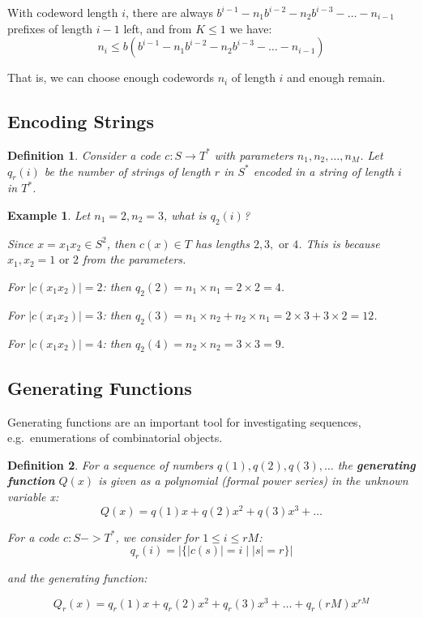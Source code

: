 \documentclass[11pt]{article}
\newtheorem{defn}{Definition}
\newtheorem{eg}{Example}
\begin{document}
With codeword length $i$, there are always $b^{i - 1} - n_1b^{i - 2} - n_2b^{i-3} - \ldots - n_{i - 1}$ prefixes of length $i - 1$ left, and from $K \leq 1$ we have:
\[ n_i \leq b(b^{i - 1} - n_1b^{i - 2} - n_2b^{i - 3} - \ldots - n_{i - 1}) \]

That is, we can choose enough codewords $n_i$ of length $i$ and enough remain.

\subsection{Encoding Strings}
\begin{defn}
  Consider a code $c : S \rightarrow T^*$ with parameters $n_1, n_2, \ldots, n_M$.
  Let $q_r(i)$ be the number of strings of length $r$ in $S^*$ encoded in a string of length $i$ in $T^*$.
\end{defn}

\begin{eg}
  Let $n_1 = 2, n_2 = 3$, what is $q_2(i)$?

  Since $x = x_1x_2 \in S^2$, then $c(x) \in T$ has lengths $2, 3, \text{ or } 4$.
  This is because $x_1, x_2 = 1 \text{ or } 2$ from the parameters.

  For $\lvert c(x_1x_2) \rvert = 2$: then $q_2(2) = n_1 \times n_1 = 2 \times 2 = 4$.

  For $\lvert c(x_1x_2) \rvert = 3$: then $q_2(3) = n_1 \times n_2 + n_2 \times n_1 = 2 \times 3 + 3 \times 2 = 12$.

  For $\lvert c(x_1x_2) \rvert = 4$: then $q_2(4) = n_2 \times n_2 = 3 \times 3 = 9$.
\end{eg}

\subsection{Generating Functions}
Generating functions are an important tool for investigating sequences, e.g.\ enumerations of combinatorial objects.

\begin{defn}
  For a sequence of numbers $q(1), q(2), q(3), \ldots$ the \textbf{generating function} $Q(x)$ is given as a polynomial (formal power series) in the unknown variable x:
  \[
    Q(x) = q(1)x + q(2)x^2 + q(3)x^3 + \ldots 
  \]

  For a code $c : S -> T^*$, we consider for $1 \leq i \leq rM$:
  \[
    q_r(i) = \lvert \{ \lvert c(s) \rvert = i \mid \lvert s \rvert = r \} \rvert
  \]

  and the generating function: 

  \[
    Q_r(x) = q_r(1)x + q_r(2)x^2 + q_r(3)x^3 + \ldots + q_r(rM)x^{rM}
  \]
\end{defn}
\end{document}
